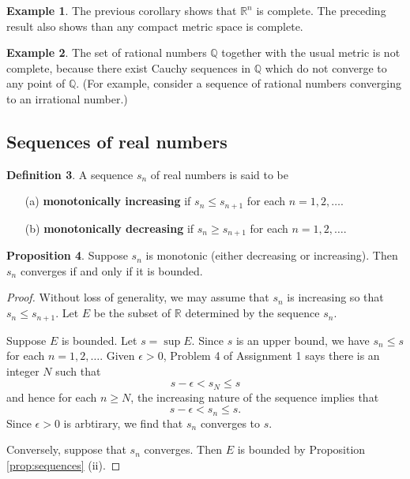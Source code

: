 \documentclass[12pt]{article}
\theoremstyle{definition}
\newtheorem{definition}{Definition}
\newtheorem{example}[definition]{Example}
\theoremstyle{theorem}
\newtheorem{proposition}[definition]{Proposition}
\begin{document}
\begin{example}
The previous corollary shows that $\mathbb{R}^n$ is complete. The preceding result also shows than any compact metric space is complete. 
\end{example}

\begin{example}
The set of rational numbers $\mathbb{Q}$ together with the usual metric is not complete, because there exist Cauchy sequences in $\mathbb{Q}$ which do not converge to any point of $\mathbb{Q}$. (For example, consider a sequence of rational numbers converging to an irrational number.)
\end{example}


\subsection{Sequences of real numbers}

\begin{definition}
A sequence $s_n$ of real numbers is said to be 
\begin{enumerate}
\item[(a)] \textbf{monotonically increasing} if $s_n \leqslant s_{n+1}$ for each $n=1, 2, \ldots$.
\item[(b)] \textbf{monotonically decreasing} if $s_n \geqslant s_{n+1}$ for each $n=1, 2, \ldots$.
\end{enumerate}
\end{definition}

\begin{proposition}\label{prop:monotonic}
Suppose $s_n$ is monotonic (either decreasing or increasing). Then $s_n$ converges if and only if it is bounded. 
\end{proposition}

\begin{proof}
Without loss of generality, we may assume that $s_n$ is increasing so that $s_n \leqslant s_{n+1}$. Let $E$ be the subset of $\mathbb{R}$ determined by the sequence $s_n$. 

Suppose $E$ is bounded. Let $s = \sup E$. Since $s$ is an upper bound, we have $s_n \leqslant s$ for each $n=1, 2, \ldots$. Given $\epsilon > 0$, Problem 4 of Assignment 1 says there is an integer $N$ such that 
\[
s - \epsilon < s_N \leqslant s
\]
and hence for each $n \geqslant N$, the increasing nature of the sequence implies that 
\[
s - \epsilon < s_n \leqslant s.
\]
Since $\epsilon > 0$ is arbtirary, we find that $s_n$ converges to $s$. 

Conversely, suppose that $s_n$ converges. Then $E$ is bounded by Proposition \ref{prop:sequences} (ii). 
\end{proof}
\end{document}
